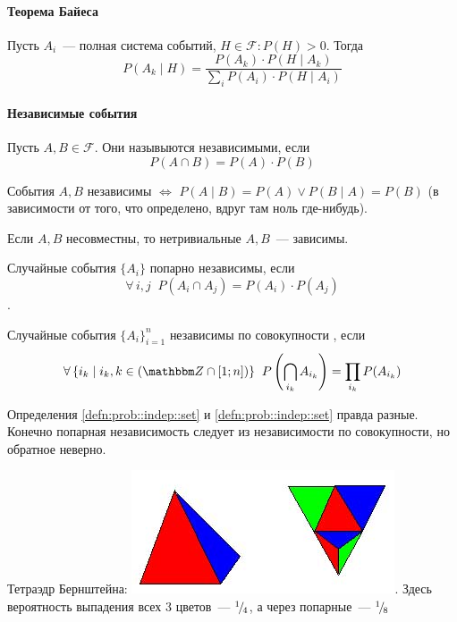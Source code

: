 \documentclass[12pt,timbord]{../../../notes}
\begin{document}
\paragraph{Теорема Байеса}
\label{par:prob::bayes}

\begin{thrm}\label{thrm:prob::bayes}
  Пусть $A_i$~--- полная система событий, $H\in \mathcal F\colon P(H)>0$. Тогда 
  \[
    P(A_k \mid H) = \frac{P(A_k)\cdot P(H \mid A_k)}{\sum_i P(A_i)\cdot P(H\mid A_i)} 
  \]
\end{thrm}

\paragraph{Независимые события}
\label{par:prob::indep}

\begin{defn}\label{defn:prob::indep::indep}
  Пусть $A, B\in \mathcal F$. Они назывыются независимыми, если 
  \[
    P(A\cap B) = P(A)\cdot P(B)
  \]
\end{defn}

\begin{prop}\label{prop:prob::indep::cond}
  События $A,B$ независимы $ \Leftrightarrow $ $P(A\mid B) = P(A) \lor P(B\mid A) = P(B)$ (в
  зависимости от того, что определено, вдруг там ноль где-нибудь).
\end{prop}
\begin{prop}\label{prop:prob::indep::zerodep}
  Если $A,B$ несовместны, то нетривиальные $A,B$~--- зависимы.
\end{prop}

\begin{defn}\label{defn:prob::indep::pair}
  Случайные события $\{A_i\}$ попарно независимы, если 
  \[\forall\,i,j\;\; P(A_i\cap A_j) = P(A_i)\cdot P(A_j)\]. 
\end{defn}
\begin{defn}\label{defn:prob::indep::set}
  Случайные события $\{A_i\}_{i=1}^n$ независимы по совокупности , если \[
    \forall\,\{i_k\mid i_k,k \in (\Z\cap[1;n]) \}\;\; P\left(\bigcap_{i_k} A_{i_k}\right) 
    = \prod_{i_k}  P(A_{i_k})
  \] 
\end{defn}
\begin{rem}\label{rem:prob::indep::bern}
  Определения \ref{defn:prob::indep::set} и \ref{defn:prob::indep::set} правда разные.
  Конечно попарная независимость следует из независимости по совокупности, но обратное неверно.
\end{rem}
\begin{exmp}\label{exmp:stat::shwartz::bern}
  Тетраэдр Бернштейна:
  \includegraphics[scale=0.5]{berntetragon}. Здесь вероятность выпадения всех 3 цветов~--- ${}^{1}\!/_{\!4}$, а через попарные~--- ${}^{1}\!/_{\!8}$
\end{exmp}
\end{document}
